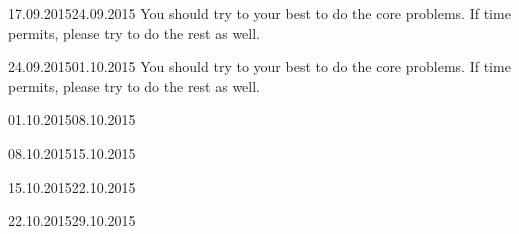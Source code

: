 \documentclass[12pt,oneside]{article}
\newcommand{\problems}{../Problems}
\theoremstyle{definition}
\begin{document}
\begin{sheet}{1}{17.09.2015}{24.09.2015}
You should try to your best to do the core problems. If time permits, please try to do the rest as well.
\end{sheet}

\begin{sheet}{2}{24.09.2015}{01.10.2015}
You should try to your best to do the core problems. If time permits, please try to do the rest as well.
 
\end{sheet}

\begin{sheet}{3}{01.10.2015}{08.10.2015}


 
 

\end{sheet}

\begin{sheet}{4}{08.10.2015}{15.10.2015}






\end{sheet}

\begin{sheet}{5}{15.10.2015}{22.10.2015}


 
 
\end{sheet}

\begin{sheet}{6}{22.10.2015}{29.10.2015}




\end{sheet}
\end{document}

